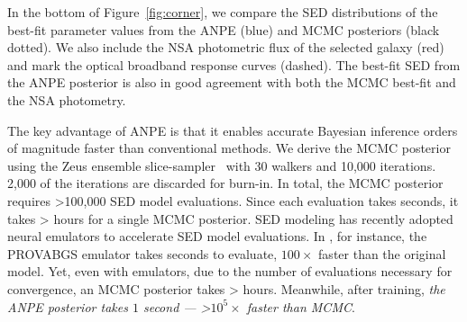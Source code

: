 In the bottom of Figure~\ref{fig:corner}, we compare the SED distributions of
the best-fit parameter values from the ANPE (blue) and MCMC posteriors (black
dotted). 
We also include the NSA photometric flux of the selected galaxy (red) and mark
the optical broadband response curves (dashed). 
The best-fit SED from the ANPE posterior is also in good agreement with both
the MCMC best-fit and the NSA photometry.  

The key advantage of ANPE is that it enables accurate Bayesian inference
orders of magnitude faster than conventional methods. 
We derive the MCMC posterior using the {\sc Zeus} ensemble
slice-sampler~\citep{karamanis2020} with 30 walkers and 10,000 iterations.
2,000 of the iterations are discarded for burn-in. 
In total, the MCMC posterior requires >100,000 SED model evaluations. 
Since each evaluation takes  seconds, it takes > hours for
a single MCMC posterior. 
SED modeling has recently adopted neural emulators to accelerate SED model
evaluations. 
In , for instance, the PROVABGS emulator takes
 seconds to evaluate, $100\times$ faster than the original model. 
Yet, even with emulators, due to the number of evaluations necessary for
convergence, an MCMC posterior takes > hours. 
Meanwhile, after training, \emph{the ANPE posterior takes $1$ second ---
>$10^5\times$ faster than MCMC}. 

